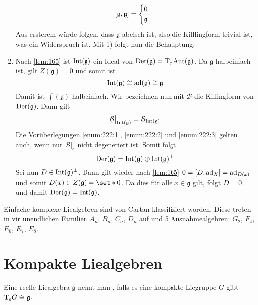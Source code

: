 \begin{beweis}
\begin{enumerate}[1)]
		\[
			\benbrace*{\mathfrak{g},\mathfrak{g}} = \begin{cases}
				0 \\
				\mathfrak{g}
			\end{cases}
		\]
		Aus ersterem würde folgen, dass $\mathfrak{g}$ abelsch ist, also die Killlingform trivial ist, was ein Widerspruch ist.
		Mit 1) folgt nun die Behauptung.
		\item Nach \autoref{lem:165} ist $\Int(\mathfrak{g})$ ein Ideal von $\Der(\mathfrak{g}) = \Tmap_e \Aut(\mathfrak{g})$.
		Da $\mathfrak{g}$ halbeinfach ist, gilt $Z(\mathfrak{g}) =0$ und somit ist
		\[
			\Int(\mathfrak{g}) \cong \ad(\mathfrak{g}) \cong \mathfrak{g}
		\]
		Damit ist $\int(\mathfrak{g})$ halbeinfach.
		Wir bezeichnen nun mit $\mathcal{B}$ die Killingform von $\Der(\mathfrak{g})$.
		Dann gilt
		\[
			\mathcal{B}\big|_{\Int(\mathfrak{g})} = \mathcal{B}_{\Int(\mathfrak{g})}
		\]
		Die Vorüberlegungen \ref{enum:222:1}, \ref{enum:222:2} und \ref{enum:222:3} gelten auch, wenn nur $\mathcal{B}|_{\mathfrak{a}}$ nicht degeneriert ist.
		Somit folgt
		\[
			\Der(\mathfrak{g}) = \Int(\mathfrak{g}) \oplus  \Int(\mathfrak{g})^\perp
		\]
		Sei nun $D \in \Int(\mathfrak{g})^\bot$.
		Dann gilt wieder nach \autoref{lem:165} $0= \benbrace*{D,\ad_X} = \ad_{D(x)}$ und somit $D(x) \in Z(\mathfrak{g}) = \set*{0}$.
		Da dies für alle $x \in \mathfrak{g}$ gilt, folgt $D=0$ und damit $\Der(\mathfrak{g}) = \Int(\mathfrak{g})$.\qedhere
	\end{enumerate}
\end{beweis}

\begin{bemerkung*}
	Einfache komplexe Liealgebren sind von Cartan klassifiziert worden.
	Diese treten in vir unendlichen Familien $A_n$, $B_n$, $C_n$, $D_n$ auf und 5 Ausnahmealgebren: $G_2$, $F_4$, $E_6$, $E_7$, $E_8$.
\end{bemerkung*}

\section{Kompakte Liealgebren} %
\label{sec:23}

\begin{definition}[{name=[{kompakte Liealgebra}]}]
	Eine reelle Liealgebra $\mathfrak{g}$ nennt man , falls es eine kompakte Liegruppe $G$ gibt $\Tmap_e G \cong \mathfrak{g}$. 
\end{definition}

